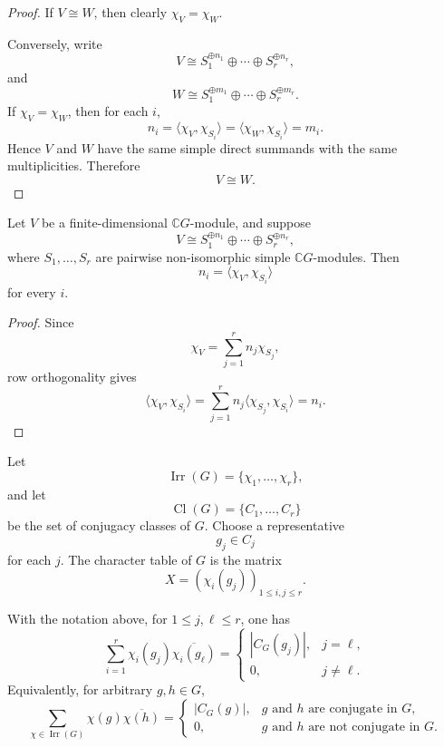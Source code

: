 \begin{proof}
    If \(V\cong W\), then clearly \(\chi_V=\chi_W\).

    Conversely, write
    \[
        V
        \cong
        S_1^{\oplus n_1}
        \oplus
        \cdots
        \oplus
        S_r^{\oplus n_r},
    \]
    and
    \[
        W
        \cong
        S_1^{\oplus m_1}
        \oplus
        \cdots
        \oplus
        S_r^{\oplus m_r}.
    \]
    If \(\chi_V=\chi_W\), then for each \(i\),
    \[
        n_i
        =
        \langle \chi_V,\chi_{S_i}\rangle
        =
        \langle \chi_W,\chi_{S_i}\rangle
        =
        m_i.
    \]
    Hence \(V\) and \(W\) have the same simple direct summands with the same
    multiplicities. Therefore
    \[
        V\cong W.
    \]
\end{proof}

\begin{corollary}
    Let \(V\) be a finite-dimensional \(\mathbb{C}G\)-module, and suppose
    \[
        V
        \cong
        S_1^{\oplus n_1}
        \oplus
        \cdots
        \oplus
        S_r^{\oplus n_r},
    \]
    where \(S_1,\dots,S_r\) are pairwise non-isomorphic simple
    \(\mathbb{C}G\)-modules. Then
    \[
        n_i
        =
        \langle \chi_V,\chi_{S_i}\rangle
    \]
    for every \(i\).
\end{corollary}

\begin{proof}
    Since
    \[
        \chi_V
        =
        \sum_{j=1}^r n_j\chi_{S_j},
    \]
    row orthogonality gives
    \[
        \langle \chi_V,\chi_{S_i}\rangle
        =
        \sum_{j=1}^r n_j\langle \chi_{S_j},\chi_{S_i}\rangle
        =
        n_i.
    \]
\end{proof}

Let
\[
    \operatorname{Irr}(G)=\{\chi_1,\dots,\chi_r\},
\]
and let
\[
    \operatorname{Cl}(G)=\{C_1,\dots,C_r\}
\]
be the set of conjugacy classes of \(G\). Choose a representative
\[
    g_j\in C_j
\]
for each \(j\). The character table of \(G\) is the matrix
\[
    X=(\chi_i(g_j))_{1\leq i,j\leq r}.
\]

\begin{theorem}
    With the notation above, for \(1\leq j,\ell\leq r\), one has
    \[
        \sum_{i=1}^r
        \chi_i(g_j)\overline{\chi_i(g_\ell)}
        =
        \begin{cases}
            |C_G(g_j)|, & j=\ell,     \\
            0,          & j\neq \ell.
        \end{cases}
    \]
    Equivalently, for arbitrary \(g,h\in G\),
    \[
        \sum_{\chi\in \operatorname{Irr}(G)}
        \chi(g)\overline{\chi(h)}
        =
        \begin{cases}
            |C_G(g)|, & g \text{ and } h \text{ are conjugate in }G,     \\
            0,        & g \text{ and } h \text{ are not conjugate in }G.
        \end{cases}
    \]
\end{theorem}

